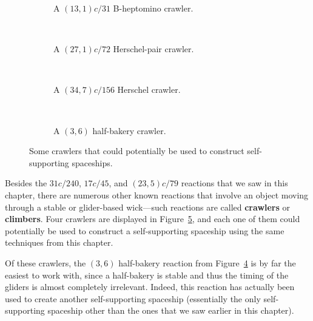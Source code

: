 \begin{figure}[!htb]
	\centering
	\begin{subfigure}{0.495\textwidth}
		\centering
		\caption{A $(13,1)c/31$ B-heptomino crawler.}\label{fig:13_1c_31_b_heptomino_climber}
	\end{subfigure} \ \ \ \begin{subfigure}{0.475\textwidth}
		\centering
		\caption{A $(27,1)c/72$ Herschel-pair crawler.}\label{fig:27_1c_72_herschel_climber}
	\end{subfigure} \\[0.2cm]
	\begin{subfigure}{0.495\textwidth}
		\centering
		\caption{A $(34,7)c/156$ Herschel crawler.}\label{fig:34_7c_156_herschel_climber}
	\end{subfigure} \ \ \ \begin{subfigure}{0.475\textwidth}
		\centering
		\caption{A $(3,6)$ half-bakery crawler.}\label{fig:half_bakery_reaction}
	\end{subfigure}
	\caption{Some crawlers that could potentially be used to construct self-supporting spaceships.}\label{fig:self_support_climbers}
\end{figure}

Besides the $31c/240$, $17c/45$, and $(23,5)c/79$ reactions that we saw in this chapter, there are numerous other known reactions that involve an object moving through a stable or glider-based wick---such reactions are called \textbf{crawlers} or \textbf{climbers}. Four crawlers are displayed in Figure~\ref{fig:self_support_climbers}, and each one of them could potentially be used to construct a self-supporting spaceship using the same techniques from this chapter.

Of these crawlers, the $(3,6)$ half-bakery reaction from Figure~\ref{fig:half_bakery_reaction} is by far the easiest to work with, since a half-bakery is stable and thus the timing of the gliders is almost completely irrelevant. Indeed, this reaction has actually been used to create another self-supporting spaceship (essentially the only self-supporting spaceship other than the ones that we saw earlier in this chapter).

